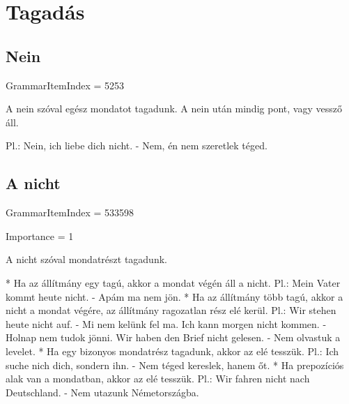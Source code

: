 \documentclass{article}
\newenvironment{desc}{\verbatim}{\endverbatim}
\begin{document}
\section{Tagadás}

\subsection{Nein}

GrammarItemIndex = 5253

\begin{desc}
A nein szóval egész mondatot tagadunk. A nein után mindig pont, vagy vessző áll.

Pl.: Nein, ich liebe dich nicht. - Nem, én nem szeretlek téged.
\end{desc}

\subsection{A nicht}

GrammarItemIndex = 533598

Importance = 1

\begin{desc}
A nicht szóval mondatrészt tagadunk.

* Ha az állítmány egy tagú, akkor a mondat végén áll a nicht.
  Pl.: Mein Vater kommt heute nicht. - Apám ma nem jön.
* Ha az állítmány több tagú, akkor a nicht a mondat végére, az állítmány ragozatlan rész elé kerül.
  Pl.: Wir stehen heute nicht auf. - Mi nem kelünk fel ma.
       Ich kann morgen nicht kommen. - Holnap nem tudok jönni.
       Wir haben den Brief nicht gelesen. - Nem olvastuk a levelet.
* Ha egy bizonyos mondatrész tagadunk, akkor az elé tesszük.
  Pl.: Ich suche nich dich, sondern ihn. - Nem téged kereslek, hanem őt.
* Ha prepozíciós alak van a mondatban, akkor az elé tesszük.
  Pl.: Wir fahren nicht nach Deutschland. - Nem utazunk Németországba.
\end{desc}
\end{document}
